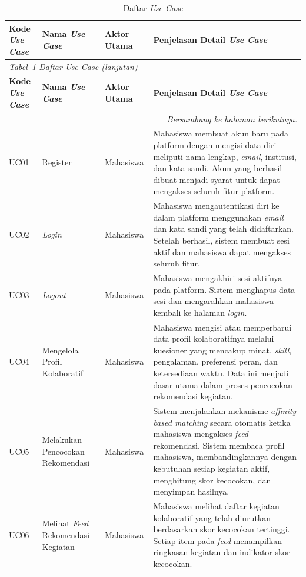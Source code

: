 \begin{longtable}{p{1.5cm} p{4.5cm} p{2cm} p{\dimexpr\linewidth-8cm-8\tabcolsep\relax}}
  \caption{Daftar \emph{Use Case}}
  \label{tab:uc-list} \\
  \toprule
  \textbf{Kode \emph{Use Case}} & \textbf{Nama \emph{Use Case}} & \textbf{Aktor Utama} & \textbf{Penjelasan Detail \emph{Use Case}} \\
  \midrule
  \endfirsthead
  \multicolumn{4}{l}{\small\textit{Tabel~\ref{tab:uc-list} Daftar \emph{Use Case} (lanjutan)}} \\
  \toprule
  \textbf{Kode \emph{Use Case}} & \textbf{Nama \emph{Use Case}} & \textbf{Aktor Utama} & \textbf{Penjelasan Detail \emph{Use Case}} \\
  \midrule
  \endhead
  \bottomrule
  \multicolumn{4}{r}{\textit{Bersambung ke halaman berikutnya.}} \\
  \endfoot
  \bottomrule
  \endlastfoot
  UC01 & Register & Mahasiswa & Mahasiswa membuat akun baru pada platform dengan mengisi data diri meliputi nama lengkap, \emph{email}, institusi, dan kata sandi. Akun yang berhasil dibuat menjadi syarat untuk dapat mengakses seluruh fitur platform. \\
  \midrule
  UC02 & \emph{Login} & Mahasiswa & Mahasiswa mengautentikasi diri ke dalam platform menggunakan \emph{email} dan kata sandi yang telah didaftarkan. Setelah berhasil, sistem membuat sesi aktif dan mahasiswa dapat mengakses seluruh fitur. \\
  \midrule
  UC03 & \emph{Logout} & Mahasiswa & Mahasiswa mengakhiri sesi aktifnya pada platform. Sistem menghapus data sesi dan mengarahkan mahasiswa kembali ke halaman \emph{login}. \\
  \midrule
  UC04 & Mengelola Profil Kolaboratif & Mahasiswa & Mahasiswa mengisi atau memperbarui data profil kolaboratifnya melalui kuesioner yang mencakup minat, \emph{skill}, pengalaman, preferensi peran, dan ketersediaan waktu. Data ini menjadi dasar utama dalam proses pencocokan rekomendasi kegiatan. \\
  \midrule
  UC05 & Melakukan Pencocokan Rekomendasi & Mahasiswa & Sistem menjalankan mekanisme \emph{affinity based matching} secara otomatis ketika mahasiswa mengakses \emph{feed} rekomendasi. Sistem membaca profil mahasiswa, membandingkannya dengan kebutuhan setiap kegiatan aktif, menghitung skor kecocokan, dan menyimpan hasilnya. \\
  \midrule
  UC06 & Melihat \emph{Feed} Rekomendasi Kegiatan & Mahasiswa & Mahasiswa melihat daftar kegiatan kolaboratif yang telah diurutkan berdasarkan skor kecocokan tertinggi. Setiap item pada \emph{feed} menampilkan ringkasan kegiatan dan indikator skor kecocokan. \\

\end{longtable}
